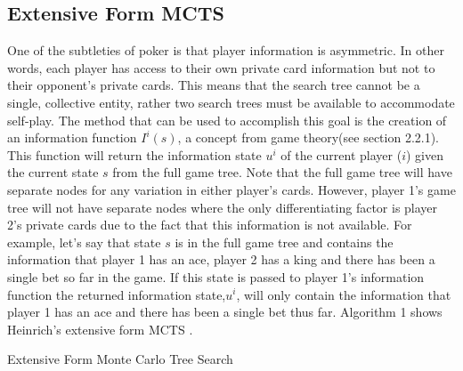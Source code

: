 \subsection{Extensive Form MCTS}\label{subsec:extensiveMCTS}
One of the subtleties of poker is that player information is asymmetric.
In other words, each player has access to their own private card
information but not to their opponent's private cards.
This means that the search tree cannot be a single, collective
entity\citep{heinrich2017reinforcement}, rather two search trees must be available
to accommodate self-play.
The method that can be used to accomplish this goal is the creation of
an information function $I^i(s)$, a concept from game theory(see section 2.2.1).
This function will return the information state $u^i$ of the current player ($i$) given
the current state $s$ from the full game tree.
Note that the full game tree will have separate nodes for any variation
in either player's cards.
However, player 1's game tree will not have separate nodes where the only
differentiating factor is player 2's private cards\citep{johanson2011accelerating}
due to the fact that this information is not available.
For example, let's say that state $s$ is in the full game tree and contains the information
that player 1 has an ace, player 2 has a king and there has been a single bet so far in the game.
If this state is passed to player 1's information function the returned information
state,$u^i$, will only contain the information that player 1 has an ace and there has been a single bet thus far.
Algorithm 1 shows Heinrich's extensive form MCTS .


\begin{algorithm}[H]
    \DontPrintSemicolon
    \LinesNumbered
    \caption{Extensive Form Monte Carlo Tree Search}
\end{algorithm}

